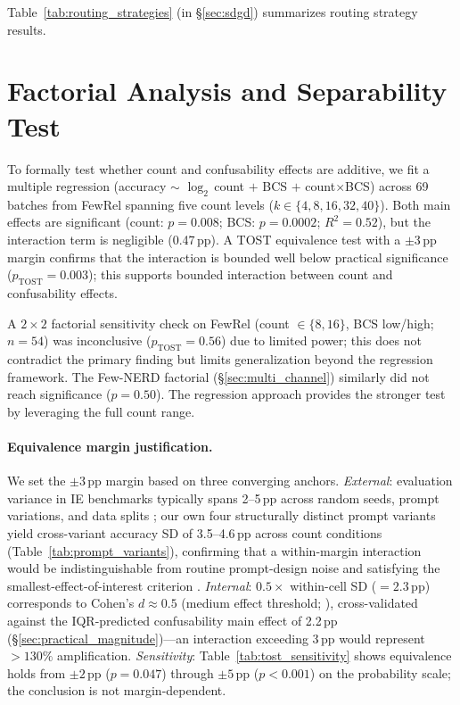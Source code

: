 \documentclass[11pt]{article}
\begin{document}
Table~\ref{tab:routing_strategies} (in \S\ref{sec:sdgd}) summarizes routing strategy results.

\section{Factorial Analysis and Separability Test}
\label{sec:appendix_factorial}

To formally test whether count and confusability effects are additive, we fit a multiple regression (accuracy $\sim$ $\log_2$\,count $+$ BCS $+$ count$\times$BCS) across 69 batches from FewRel spanning five count levels ($k \in \{4, 8, 16, 32, 40\}$). Both main effects are significant (count: $p = 0.008$; BCS: $p = 0.0002$; $R^2 = 0.52$), but the interaction term is negligible (0.47\,pp). A TOST equivalence test with a $\pm 3$\,pp margin confirms that the interaction is bounded well below practical significance ($p_{\text{TOST}} = 0.003$); this supports bounded interaction between count and confusability effects.

A $2 \times 2$ factorial sensitivity check on FewRel (count $\in \{8, 16\}$, BCS low/high; $n = 54$) was inconclusive ($p_{\text{TOST}} = 0.56$) due to limited power; this does not contradict the primary finding but limits generalization beyond the regression framework. The Few-NERD factorial (\S\ref{sec:multi_channel}) similarly did not reach significance ($p = 0.50$). The regression approach provides the stronger test by leveraging the full count range.

\paragraph{Equivalence margin justification.}
We set the $\pm 3$\,pp margin based on three converging anchors. \emph{External}: evaluation variance in IE benchmarks typically spans 2--5\,pp across random seeds, prompt variations, and data splits \citep{card-2020-power,dror-2018-significance}; our own four structurally distinct prompt variants yield cross-variant accuracy SD of 3.5--4.6\,pp across count conditions (Table~\ref{tab:prompt_variants}), confirming that a within-margin interaction would be indistinguishable from routine prompt-design noise and satisfying the smallest-effect-of-interest criterion \citep{lakens-2017-equivalence}. \emph{Internal}: $0.5 \times$ within-cell SD ($= 2.3$\,pp) corresponds to Cohen's $d \approx 0.5$ (medium effect threshold; \citealt{lakens-2017-equivalence}), cross-validated against the IQR-predicted confusability main effect of 2.2\,pp (\S\ref{sec:practical_magnitude})---an interaction exceeding 3\,pp would represent ${>}130\%$ amplification. \emph{Sensitivity}: Table~\ref{tab:tost_sensitivity} shows equivalence holds from $\pm 2$\,pp ($p = 0.047$) through $\pm 5$\,pp ($p < 0.001$) on the probability scale; the conclusion is not margin-dependent.
\end{document}
